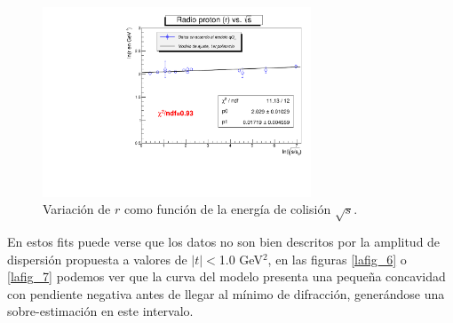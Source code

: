 \begin{figure}[H]\centering
\includegraphics[width=8cm]{graficas/radioproton.pdf}
\caption{Variación de $r$ como función de la energía de colisión $\sqrt{s}$.}
\label{lafig_radioprotonNg}
\end{figure}
En estos fits puede verse que los datos no son bien descritos por la amplitud de dispersión propuesta a valores de $|t|<$1.0 GeV$^2$, en las figuras \ref{lafig_6} o \ref{lafig_7} podemos ver que la curva del modelo presenta una peque\~na concavidad con pendiente negativa antes de llegar al m\'inimo de difracción, generándose una sobre-estimación en este intervalo.
